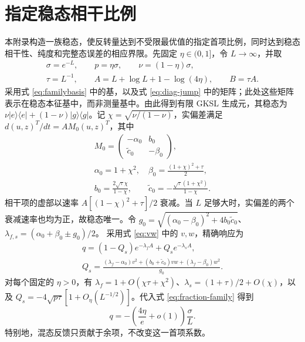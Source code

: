 \documentclass[aps,pra,reprint,amsmath,amssymb,nofootinbib,floatfix,longbibliography]{revtex4-2}
\theoremstyle{aps}
\newcommand{\proj}[1]{|#1\rangle\langle#1|}
\begin{document}
\section{指定稳态相干比例}\label{app:coherence-fraction}

本附录构造一族稳态，使反转量达到不受限最优值的指定首项比例，同时达到稳态相干性、纯度和完整态误差的相应界限。先固定 $\eta\in(0,1]$，令 $L\to\infty$，并取
\begin{equation}\label{eq:fraction-family}
 \begin{gathered}
 \sigma=e^{-L},\qquad p=\eta\sigma,\qquad\nu=(1-\eta)\sigma,\\
 \tau=L^{-1},\qquad A=L+\log L+1-\log(4\eta),\qquad B=\tau A.
 \end{gathered}
\end{equation}
采用式 \eqref{eq:familybasis} 中的基，以及式 \eqref{eq:diag-jump} 中的矩阵；此处这些矩阵表示在稳态本征基中，而非测量基中。由此得到有限 GKSL 生成元，其稳态为 $\nu\proj e+(1-\nu)\proj g$。记 $\chi=\sqrt{\nu/(1-\nu)}$，实偏差满足 $d(u,z)^T/dt=A M_0(u,z)^T$，其中
\begin{equation}\label{eq:fraction-matrix}
 \begin{gathered}
 M_0=\begin{pmatrix}-\alpha_0&b_0\\\widetilde c_0&-\beta_0\end{pmatrix},\\
 \alpha_0=1+\chi^2,\quad\beta_0=\frac{(1+\chi)^2+\tau}{2},\\
 b_0=\frac{2\sqrt\tau\chi}{1-\chi},\qquad
 \widetilde c_0=-\frac{\sqrt\tau(1+\chi^2)}{1-\chi}.
 \end{gathered}
\end{equation}
相干项的虚部以速率 $A[(1-\chi)^2+\tau]/2$ 衰减。当 $L$ 足够大时，实偏差的两个衰减速率也均为正，故稳态唯一。令
$g_0=\sqrt{(\alpha_0-\beta_0)^2+4b_0\widetilde c_0}$、
$\lambda_{f,s}=(\alpha_0+\beta_0\pm g_0)/2$。
采用式 \eqref{eq:vw} 中的 $v,w$，精确响应为
\begin{equation}\label{eq:fraction-response}
 \begin{gathered}
 q=(1-Q_s)e^{-\lambda_f A}+Q_s e^{-\lambda_s A},\\
 Q_s=\frac{(\lambda_f-\alpha_0)v^2+(b_0+\widetilde c_0)vw
 +(\lambda_f-\beta_0)w^2}{g_0}.
 \end{gathered}
\end{equation}
对每个固定的 $\eta>0$，有 $\lambda_f=1+O(\chi\tau+\chi^2)$、$\lambda_s=(1+\tau)/2+O(\chi)$，以及 $Q_s=-4\sqrt{p\tau}[1+O_\eta(L^{-1/2})]$。代入式 \eqref{eq:fraction-family} 得到
\begin{equation}\label{eq:fraction-gain}
 q=-\left(\frac{4\eta}{e}+o(1)\right)\frac\sigma L.
\end{equation}
特别地，混态反馈只贡献于余项，不改变这一首项系数。
\end{document}
